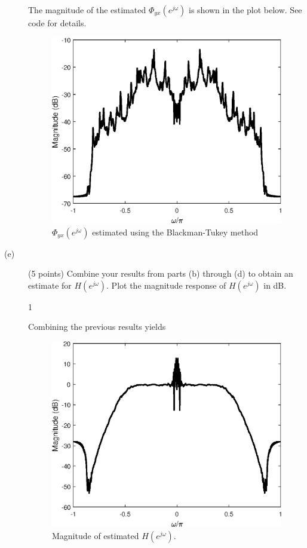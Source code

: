 \documentclass[10pt]{article}
\def\SOLUTIONS{1} %
\def\SolutionsColor{red2}
\begin{document}
\begin{description}
{		The magnitude of the estimated $\Phi_{yx}(e^{j\omega})$ is shown in the plot below. See code for details.
			
		\FloatBarrier
		\begin{figure}[h!]
				\centering
				\includegraphics[scale=0.7]{figs/noise_cancel_cross_psd.eps}
				\caption{$\Phi_{yx}(e^{j\omega})$ estimated using the Blackman-Tukey method}
				\label{fig:noise_cancel_cross_psd}
		\end{figure}
		\FloatBarrier
		}\fi
	
	\item[(e)] (5 points) Combine your results from parts (b) through (d) to obtain an estimate for $H(e^{j\omega})$. Plot the magnitude response of $H(e^{j\omega})$ in dB.
	
	
	\if\SOLUTIONS1 {\color{\SolutionsColor} Combining the previous results yields
				
		\FloatBarrier
		\begin{figure}[h!]
			\centering
			\includegraphics[scale=0.7]{figs/noise_cancel_Hest.eps}
			\caption{Magnitude of estimated $H(e^{j\omega})$.}
			\label{fig:noise_cancel_Hest}
		\end{figure}
		\FloatBarrier
	}\fi
	

\end{description}
\end{document}
